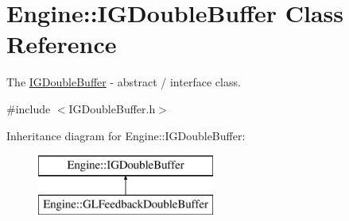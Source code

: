 \hypertarget{classEngine_1_1IGDoubleBuffer}{}\section{Engine\+:\+:I\+G\+Double\+Buffer Class Reference}
\label{classEngine_1_1IGDoubleBuffer}


The \hyperlink{classEngine_1_1IGDoubleBuffer}{I\+G\+Double\+Buffer} -\/ abstract / interface class.  




{\ttfamily \#include $<$I\+G\+Double\+Buffer.\+h$>$}

Inheritance diagram for Engine\+:\+:I\+G\+Double\+Buffer\+:\begin{figure}[H]
\begin{center}
\leavevmode
\includegraphics[height=2.000000cm]{classEngine_1_1IGDoubleBuffer}
\end{center}
\end{figure}
